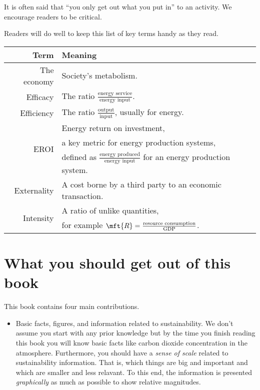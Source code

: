 {It is often said that ``you only get out what you put in'' to an activity.
We encourage readers to be critical.

Readers will do well to keep this list of key terms handy as they read.

\begin{table}[h!]
\centering
\begin{tabular}{r l}
\toprule
Term                  & Meaning      \\ 
\midrule
The economy           & Society's metabolism. \\
%
Efficacy              & The ratio $\frac{\text{energy service}}{\text{energy input}}$. \\
%
Efficiency            & The ratio $\frac{\text{output}}{\text{input}}$, usually for energy.  \\
%
\multirow{3}{*}{EROI} & Energy return on investment, \\
                      & a key metric for energy production systems, \\
                      & defined as $\frac{\text{energy produced}}{\text{energy input}}$ for an energy production system. \\
%
Externality           & A cost borne by a third party to an economic transaction. \\
%
\multirow{2}{*}{Intensity}  & A ratio of unlike quantities, \\
                            & for example $\mft{R} = \frac{\text{resource consumption}}{\text{GDP}}$. \\
\bottomrule
\end{tabular}
\label{tab:key_terms}
\end{table}



\section*{What you should get out of this book} 

This book contains four main contributions.

\begin{itemize}

  \item Basic facts, figures, and information related to sustainability. 
        We don't assume you start with any prior knowledge but by the time you finish 
        reading this book you will know basic facts like carbon dioxide 
        concentration in the atmosphere. 
        Furthermore, you should have a \emph{sense of scale} related to sustainability 
        information. 
        That is, which things are big and important and 
        which are smaller and less relavant. 
        To this end, the information is presented \emph{graphically} as much as possible 
        to show relative magnitudes.
        

\end{itemize}}
